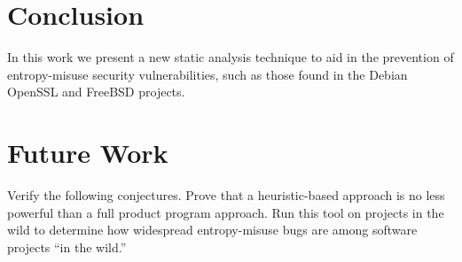 \documentclass[letterpaper,twocolumn,10pt]{article}
\begin{document}

\section{Conclusion}

In this work we present a new static analysis technique to aid in the prevention of entropy-misuse security vulnerabilities, such as those
found in the Debian OpenSSL and FreeBSD projects.

\section{Future Work}

Verify the following conjectures. Prove that a heuristic-based approach is no less powerful than a full product program approach.
Run this tool on projects in the wild to determine how widespread entropy-misuse bugs are among software projects ``in the wild.''

{\normalsize 
}



\end{document}
